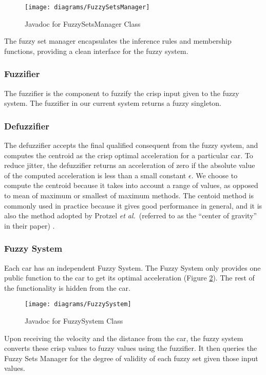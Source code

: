 \documentclass[12pt,letterpaper,oneside]{report}
\newcommand \qq[1]{``{#1}''}
\newcommand \etal{\textit{et al.}}
\begin{document}
\begin{figure}[h]
  \centering
  \texttt{[image: diagrams/FuzzySetsManager]} 
  \caption{Javadoc for FuzzySetsManager Class} \label{fig:java-fsmgr}
\end{figure}

The fuzzy set manager encapsulates the inference rules and membership
functions, providing a clean interface for the fuzzy system. 

\subsubsection{Fuzzifier}
The fuzzifier is the component to fuzzify the crisp input given to the fuzzy system.
The fuzzifier in our current system returns a fuzzy singleton.

\subsubsection{Defuzzifier}
The defuzzifier accepts the final qualified consequent from the fuzzy system,
and computes the centroid as the crisp optimal acceleration for a particular car. 
To reduce jitter, the defuzzifier returns an acceleration of zero if the 
absolute value of the computed acceleration is less than a small constant 
$ \epsilon $. We
choose to compute the centroid because it takes into account a range of values, as
opposed to mean of maximum or smallest of maximum methods. The centoid method is commonly
used in practice because it gives good performance in general, and it is also
the method adopted by Protzel \etal~(referred to as the \qq{center of gravity} 
in their paper) \cite{protzel-fuzzy}.

\subsubsection{Fuzzy System}
Each car has an independent Fuzzy System. The Fuzzy System only provides one
public function to the car to get its optimal acceleration (Figure
\ref{fig:java-fs}).  The rest of the functionality is hidden from the car. 

\begin{figure}[h]
  \centering
  \texttt{[image: diagrams/FuzzySystem]} 
  \caption{Javadoc for FuzzySystem Class} \label{fig:java-fs}
\end{figure}

Upon receiving the velocity and the distance from the car, the fuzzy system
converts these crisp values to fuzzy values using the fuzzifier. It then
queries the Fuzzy Sets Manager for the degree of validity of each fuzzy set
given those input values.
\end{document}
